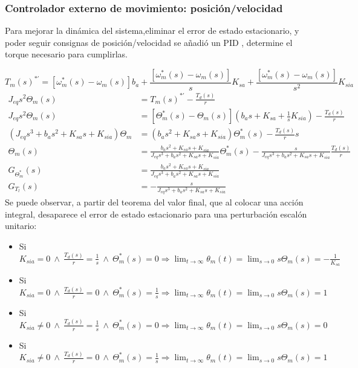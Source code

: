 \documentclass[a4paper, 10pt, onecolumn,journal]{ieeeconf}
\begin{document}
\subsubsection{\textbf{Controlador externo de movimiento: posición/velocidad}}
Para mejorar la dinámica del sistema,eliminar el error de estado estacionario, y poder seguir consignas de posición/velocidad se añadió un PID , determine el torque necesario para cumplirlas.

\begin{equation}
	{T_m(s)}^{*'} = \left[ {\omega}_m^{*}(s)-{\omega}_m(s)\right] b_a + \frac{\left[ {\omega}_m^{*}(s)-{\omega}_m(s)\right]}{s} K_{sa} + \frac{\left[ {\omega}_m^{*}(s)-{\omega}_m(s)\right]}{s^2} K_{sia}
\end{equation}
\begin{align}
	J_{eq} s^2 \Theta_m(s) &= {T_m(s)}^{*'}- \frac{T_d(s)}{r }  \\
	J_{eq} s^2 \Theta_m(s) &= \left[ {\Theta}_m^{*}(s)-{\Theta}_m(s)\right] \left( b_a s + K_{sa} + \frac{1}{s} K_{sia}\right)  - \frac{T_d(s)}{r } \\
	\left( J_{eq} s^3 + b_a s^2 + K_{sa} s +  K_{sia}\right) \Theta_m &=   \left( b_a s^2 + K_{sa} s + K_{sia}\right) {\Theta}_m^{*}(s)  - \frac{T_d(s)}{r} s \\ 
	\Theta_m(s) &= \frac{ b_a s^2 + K_{sa} s + K_{sia}}{J_{eq} s^3 + b_a s^2 + K_{sa} s +  K_{sia}} {\Theta}_m^{*}(s)  - \frac{s}{J_{eq} s^3 + b_a s^2 + K_{sa} s +  K_{sia}} \frac{T_d(s)}{r} \\
	G_{{\Theta}_m^{*}}(s) &= \frac{ b_a s^2 + K_{sa} s + K_{sia}}{J_{eq} s^3 + b_a s^2 + K_{sa} s +  K_{sia}} \\
	G_{T_l}(s) &= -\frac{s}{J_{eq} s^3 + b_a s^2 + K_{sa} s +  K_{sia}}
\end{align}
Se puede observar, a partir del teorema del valor final, que al colocar una acción integral, desaparece el error de estado estacionario para una perturbación escalón unitario:

\begin{itemize}
	\item Si $K_{sia}=0 \: \land \: \frac{T_d(s)}{r} = \frac{1}{s} \: \land \: {\Theta}_m^{*}(s) = 0 \Rightarrow \lim_{t \to \infty} \theta_m(t) = \lim_{s \to 0} s\Theta_m(s) = -\frac{1}{K_{sa}} $ 
	\item Si $K_{sia}=0 \: \land \: \frac{T_d(s)}{r} = 0 \: \land \: {\Theta}_m^{*}(s) = \frac{1}{s} \Rightarrow \lim_{t \to \infty} \theta_m(t) = \lim_{s \to 0} s\Theta_m(s) = 1 $
	\item Si $K_{sia}\neq0 \: \land \: \frac{T_d(s)}{r} = \frac{1}{s} \: \land \: {\Theta}_m^{*}(s) = 0 \Rightarrow \lim_{t \to \infty} \theta_m(t) = \lim_{s \to 0} s\Theta_m(s) = 0$
	\item Si $K_{sia}\neq0 \: \land \: \frac{T_d(s)}{r} = 0 \: \land \: {\Theta}_m^{*}(s) = \frac{1}{s} \Rightarrow \lim_{t \to \infty} \theta_m(t) = \lim_{s \to 0} s\Theta_m(s) = 1 $
\end{itemize}
\end{document}

